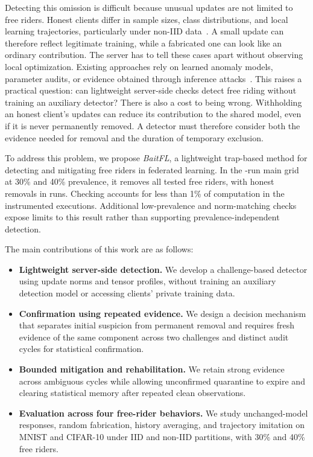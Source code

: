 \documentclass[journal]{IEEEtran}
\begin{document}
Detecting this omission is difficult because unusual updates are not limited
to free riders. Honest clients differ in sample sizes, class distributions,
and local learning trajectories, particularly under non-IID
data~\cite{kairouz2021advances}. A small update can therefore reflect
legitimate training, while a fabricated one can look like an ordinary
contribution. The server has to tell these cases apart without observing
local optimization. Existing approaches rely on learned anomaly models,
parameter audits, or evidence obtained through inference
attacks~\cite{lin2019freeriders,wang2024pass,recasens2026frida}. This raises a
practical question: can lightweight server-side checks detect free riding
without training an auxiliary detector? There is also a cost to being wrong.
Withholding an honest client's updates can reduce its contribution to the shared
model, even if it is never permanently removed. A detector must therefore
consider both the evidence needed for removal and the duration of temporary
exclusion.

To address this problem, we propose \emph{BaitFL}, a lightweight trap-based
method for detecting and mitigating free riders in federated learning.
In the \ReviewRunCount{}-run main grid at 30\% and 40\% prevalence,
it removes all tested free riders,
with \MultiFP{} honest removals in \ReviewAffectedRuns{} runs. Checking
accounts for less than 1\% of computation in the instrumented executions.
Additional low-prevalence and norm-matching checks expose limits to this
result rather than supporting prevalence-independent detection.

\noindent The main contributions of this work are as follows:
\begin{itemize} %
\item \textbf{Lightweight server-side detection.} We develop a challenge-based
detector using update norms and tensor profiles, without training an auxiliary
detection model or accessing clients' private training data.
\item \textbf{Confirmation using repeated evidence.} We design a decision
mechanism that separates initial suspicion from permanent removal and requires
fresh evidence of the same component across two challenges and distinct audit
cycles for statistical confirmation.
\item \textbf{Bounded mitigation and rehabilitation.} We retain strong evidence
across ambiguous cycles while allowing unconfirmed quarantine to expire and
clearing statistical memory after repeated clean observations.
\item \textbf{Evaluation across four free-rider behaviors.} We study unchanged-model
responses, random fabrication, history averaging, and trajectory imitation on
MNIST and CIFAR-10 under IID and non-IID partitions, with 30\% and 40\% free riders.
\end{itemize}
\end{document}
